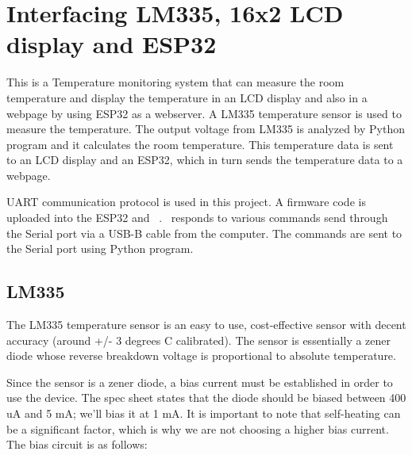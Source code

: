 \chapter {Interfacing LM335, 16x2 LCD display and ESP32}
\thispagestyle{empty}
\label{LCD}
\label{LM335}
\label{ESP32}

\newcommand{\LocTMPfig}{\Origin/user-code/Tmp-Mon/figures}
\newcommand{\LocTMPardcode}{\Origin/user-code/Tmp-Mon/arduino}
\newcommand{\LocTMPardbrief}[1]{{\tt\seqsplit{Origin/user-code/Tmp-Mon/arduino/#1}}}

\newcommand{\LocTMPpycode}{\Origin/user-code/Tmp-Mon/python}
\newcommand{\LocTMPpybrief}[1]{{\tt
\seqsplit{Origin/user-code/Tmp-Mon/python/#1}}}


This is a Temperature monitoring system that can measure the
room temperature and display the temperature in an LCD display
and also in a webpage by using ESP32 as a webserver. A LM335
temperature sensor is used to measure the temperature. The
output voltage from LM335 is analyzed by Python program and it
calculates the room temperature. This temperature data is sent
to an
LCD display and an ESP32, which in turn sends the temperature
data to a webpage.

UART communication protocol is used in this project. A firmware
code is uploaded into the ESP32 and \arduino\ . \arduino\
responds to various commands send through the Serial port via a
USB-B
cable from the computer. The commands are sent to the Serial
port using Python program.


\section{LM335}
The LM335 temperature sensor is an easy to use, cost-effective
sensor with decent accuracy (around +/- 3 degrees C calibrated).
The sensor is essentially a zener diode whose reverse breakdown
voltage is proportional to absolute temperature.

Since the sensor is a zener diode, a bias current must be
established in order to use the device. The spec sheet states
that the diode should be biased between 400 uA and 5 mA; we'll
bias it
at 1 mA. It is important to note that self-heating can be a
significant factor, which is why we are not choosing a higher
bias current. The bias circuit is as follows:


